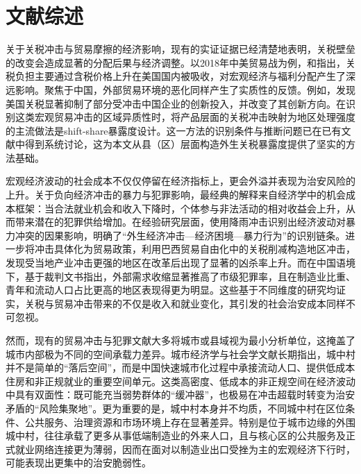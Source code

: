 \documentclass[a4paper,12pt]{report}
\begin{document}
\chapter{文献综述}
\label{sec:related_literature_cn}

关于关税冲击与贸易摩擦的经济影响，现有的实证证据已经清楚地表明，关税壁垒的改变会造成显著的分配后果与经济调整。以2018年中美贸易战为例，\textcite{amiti2019impact}和\textcite{fajgelbaum2020return}指出，关税负担主要通过含税价格上升在美国国内被吸收，对宏观经济与福利分配产生了深远影响。聚焦于中国，外部贸易环境的恶化同样产生了实质性的反馈。例如，\textcite{ma2025market}发现美国关税显著抑制了部分受冲击中国企业的创新投入，并改变了其创新方向。在识别这类宏观贸易冲击的区域异质性时，将产品层面的关税冲击映射为地区处理强度的主流做法是shift-share暴露度设计\citep{autor2013china}。这一方法的识别条件与推断问题已在已有文献中得到系统讨论\citep{goldsmithpinkham2020bartik,adao2019shiftshare}，这为本文从县（区）层面构造外生关税暴露度提供了坚实的方法基础。

宏观经济波动的社会成本不仅仅停留在经济指标上，更会外溢并表现为治安风险的上升。关于负向经济冲击的暴力与犯罪影响，最经典的解释来自经济学中的机会成本框架：当合法就业机会和收入下降时，个体参与非法活动的相对收益会上升，从而带来潜在的犯罪供给增加\citep{becker1968crime}。在经验研究层面，\textcite{miguel2004economic}使用降雨冲击识别出经济波动对暴力冲突的因果影响，明确了“外生经济冲击—经济困境—暴力行为”的识别链条。\textcite{dixcarneirosoaresulyssea2018economic}进一步将冲击具体化为贸易政策，利用巴西贸易自由化中的关税削减构造地区冲击，发现受当地产业冲击更强的地区在改革后出现了显著的凶杀率上升。而在中国语境下，\textcite{ma2025export}基于裁判文书指出，外部需求收缩显著推高了市级犯罪率，且在制造业比重、青年和流动人口占比更高的地区表现得更为明显。这些基于不同维度的研究均证实，关税与贸易冲击带来的不仅是收入和就业变化，其引发的社会治安成本同样不可忽视。

然而，现有的贸易冲击与犯罪文献大多将城市或县域视为最小分析单位，这掩盖了城市内部极为不同的空间承载力差异。城市经济学与社会学文献长期指出，城中村并不是简单的“落后空间”，而是中国快速城市化过程中承接流动人口、提供低成本住房和非正规就业的重要空间单元\citep{wang2009urbanization,liu2016segmentation}。这类高密度、低成本的非正规空间在经济波动中具有双面性：既可能充当弱势群体的“缓冲器”，也极易在冲击超载时转变为治安矛盾的“风险集聚地”。更为重要的是，城中村本身并不均质，不同城中村在区位条件、公共服务、治理资源和市场环境上存在显著差异\citep{krueckeberg2004lessons,marx2019knowing}。特别是位于城市边缘的外围城中村，往往承载了更多从事低端制造业的外来人口，且与核心区的公共服务及正式就业网络连接更为薄弱，因而在面对以制造业出口受挫为主的宏观经济下行时，可能表现出更集中的治安脆弱性。
\end{document}
